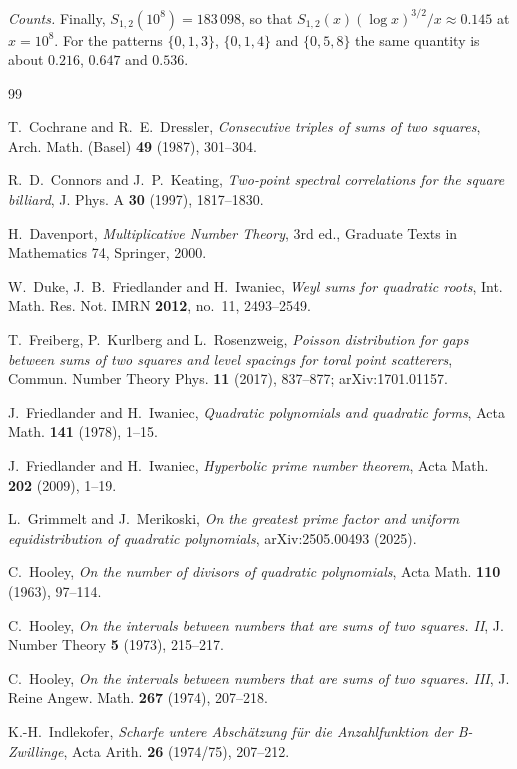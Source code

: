 \documentclass[11pt]{amsart}
\theoremstyle{remark}
\theoremstyle{definition}
\numberwithin{equation}{section}
\begin{document}
\emph{Counts.} Finally, $S_{1,2}(10^8)=183\,098$, so that $S_{1,2}(x)(\log x)^{3/2}/x\approx0.145$ at $x=10^8$. For the patterns $\{0,1,3\}$, $\{0,1,4\}$ and $\{0,5,8\}$ the same quantity is about $0.216$, $0.647$ and $0.536$.

\begin{thebibliography}{99}

 T.~Cochrane and R.~E.~Dressler, \emph{Consecutive triples of sums of two squares}, Arch. Math. (Basel) \textbf{49} (1987), 301--304.

 R.~D.~Connors and J.~P.~Keating, \emph{Two-point spectral correlations for the square billiard}, J. Phys. A \textbf{30} (1997), 1817--1830.

 H.~Davenport, \emph{Multiplicative Number Theory}, 3rd ed., Graduate Texts in Mathematics 74, Springer, 2000.

 W.~Duke, J.~B.~Friedlander and H.~Iwaniec, \emph{Weyl sums for quadratic roots}, Int. Math. Res. Not. IMRN \textbf{2012}, no.~11, 2493--2549.

 T.~Freiberg, P.~Kurlberg and L.~Rosenzweig, \emph{Poisson distribution for gaps between sums of two squares and level spacings for toral point scatterers}, Commun. Number Theory Phys. \textbf{11} (2017), 837--877; arXiv:1701.01157.

 J.~Friedlander and H.~Iwaniec, \emph{Quadratic polynomials and quadratic forms}, Acta Math. \textbf{141} (1978), 1--15.

 J.~Friedlander and H.~Iwaniec, \emph{Hyperbolic prime number theorem}, Acta Math. \textbf{202} (2009), 1--19.

 L.~Grimmelt and J.~Merikoski, \emph{On the greatest prime factor and uniform equidistribution of quadratic polynomials}, arXiv:2505.00493 (2025).

 C.~Hooley, \emph{On the number of divisors of quadratic polynomials}, Acta Math. \textbf{110} (1963), 97--114.

 C.~Hooley, \emph{On the intervals between numbers that are sums of two squares. II}, J. Number Theory \textbf{5} (1973), 215--217.

 C.~Hooley, \emph{On the intervals between numbers that are sums of two squares. III}, J. Reine Angew. Math. \textbf{267} (1974), 207--218.

 K.-H.~Indlekofer, \emph{Scharfe untere Absch\"atzung f\"ur die Anzahlfunktion der B-Zwillinge}, Acta Arith. \textbf{26} (1974/75), 207--212.


\end{thebibliography}
\end{document}
